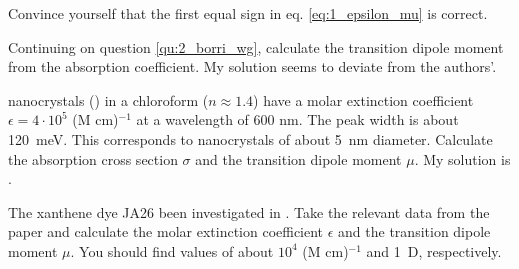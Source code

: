 \begin{questions}
  \item Convince yourself that the first equal sign in eq.  \ref{eq:1_epsilon_mu} is correct.
  \item Continuing on question \ref{qu:2_borri_wg}, calculate the transition dipole moment from the absorption coefficient. My solution  seems to deviate from the authors'.
  \item {} nanocrystals (\cite{Jasieniak:2009er}) in a chloroform ($n \approx 1.4$) have a molar extinction coefficient $\epsilon = 4 \cdot 10^5$ (M cm)$^{-1}$ at a wavelength of 600 nm. The peak width is about 120~meV. This corresponds to nanocrystals of about 5~nm diameter. Calculate the absorption cross section $\sigma$ and the transition dipole moment $\mu$. My solution is .
  \item The xanthene dye JA26 been investigated in \cite{Kastrup:2004p1737}. Take the relevant data from the paper and calculate the molar extinction coefficient $\epsilon$ and the transition dipole moment $\mu$. You should find values of about $10^4$  (M cm)$^{-1}$ and 1~D, respectively.
\end{questions}

\printbibliography[segment=\therefsegment,heading=subbibliography]
